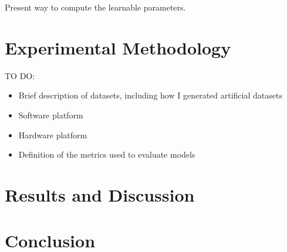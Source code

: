 \documentclass[BSc]{usydthesis}
\numberwithin{equation}{chapter}
\theoremstyle{remark}
\begin{document}
Present way to compute the learnable parameters.

\chapter{Experimental Methodology}
TO DO:

\begin{itemize}
 \item Brief description of datasets, including how I generated artificial datasets
 \item Software platform
 \item Hardware platform
 \item Definition of the metrics used to evaluate models
\end{itemize}

\chapter{Results and Discussion}

\chapter{Conclusion}
\end{document}
